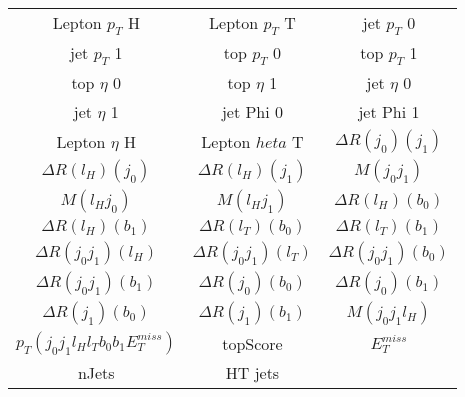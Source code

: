   \begin{center}
  \begin{tabular}{ccc}
    \hline\hline
    Lepton  $p_T$ H & Lepton  $p_T$ T & jet  $p_T$ 0 \\
    jet  $p_T$ 1 & top  $p_T$ 0 & top  $p_T$ 1 \\
    top  $\eta$ 0 & top  $\eta$ 1 & jet  $\eta$ 0 \\
    jet  $\eta$ 1 & jet Phi 0 & jet Phi 1 \\
    Lepton  $\eta$ H & Lepton  $heta$ T & $\Delta R(j_0)(j_1)$ \\
    $\Delta R(l_{H})(j_0)$ & $\Delta R(l_{H})(j_1)$ & $M(j_0j_1)$ \\
    $M(l_{H}j_0)$ & $M(l_{H}j_1)$ & $\Delta R(l_{H})(b_0)$ \\
    $\Delta R(l_{H})(b_1)$ & $\Delta R(l_{T})(b_0)$ & $\Delta R(l_{T})(b_1)$ \\
    $\Delta R(j_0j_1)(l_{H})$ & $\Delta R(j_0j_1)(l_{T})$ & $\Delta R(j_0j_1)(b_0)$ \\
    $\Delta R(j_0j_1)(b_1)$ & $\Delta R(j_0)(b_0)$ & $\Delta R(j_0)(b_1)$ \\
    $\Delta R(j_1)(b_0)$ & $\Delta R(j_1)(b_1)$ & $M(j_0j_1l_{H})$ \\
     $p_T(j_0j_1l_{H}l_{T}b_0b_1E_T^{miss})$ & topScore & $E_T^{miss}$ \\
    nJets & HT jets & \\
    \hline
  \end{tabular}
  \end{center}


